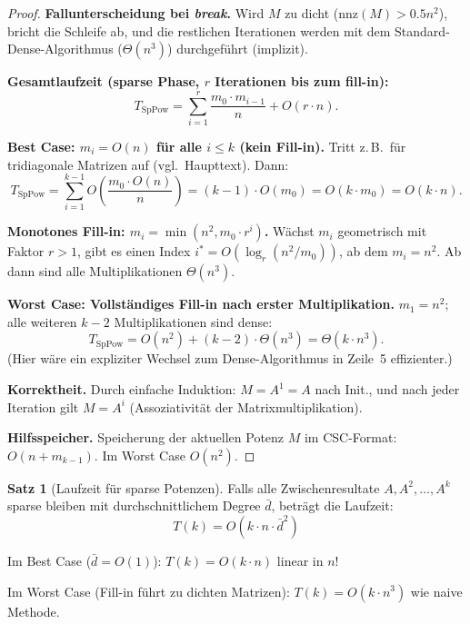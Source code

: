 \documentclass[a4paper,12pt]{report}
\theoremstyle{definition}
\newtheorem{satz}{Satz}
\begin{document}
\begin{proof}
		\textbf{Fallunterscheidung bei \textit{break}.} Wird $M$ zu dicht ($\mathrm{nnz}(M) > 0.5 n^2$), bricht die Schleife ab, und die restlichen Iterationen werden mit dem Standard-Dense-Algorithmus ($\Theta(n^3)$) durchgeführt (implizit).

		\textbf{Gesamtlaufzeit (sparse Phase, $r$ Iterationen bis zum fill-in):}
		\[
			T_{\mathrm{SpPow}} = \sum_{i=1}^{r} \frac{m_0 \cdot m_{i-1}}{n} + O(r \cdot n).
		\]

		\textbf{Best Case: $m_i = O(n)$ für alle $i \leq k$ (kein Fill-in).}
		Tritt z.\,B.\ für tridiagonale Matrizen auf (vgl.\ Haupttext). Dann:
		\[
			T_{\mathrm{SpPow}} = \sum_{i=1}^{k-1} O\!\left(\frac{m_0 \cdot O(n)}{n}\right) = (k-1) \cdot O(m_0) = O(k \cdot m_0) = O(k \cdot n).
		\]

		\textbf{Monotones Fill-in: $m_i = \min(n^2, m_0 \cdot r^i)$.} Wächst $m_i$ geometrisch mit Faktor $r > 1$, gibt es einen Index $i^* = O(\log_r(n^2/m_0))$, ab dem $m_i = n^2$. Ab dann sind alle Multiplikationen $\Theta(n^3)$.

		\textbf{Worst Case: Vollständiges Fill-in nach erster Multiplikation.}
		$m_1 = n^2$; alle weiteren $k-2$ Multiplikationen sind dense:
		\[
			T_{\mathrm{SpPow}} = O(n^2) + (k-2) \cdot \Theta(n^3) = \Theta(k \cdot n^3).
		\]
		(Hier wäre ein expliziter Wechsel zum Dense-Algorithmus in Zeile~5 effizienter.)

		\textbf{Korrektheit.} Durch einfache Induktion: $M = A^1 = A$ nach Init., und nach jeder Iteration gilt $M = A^i$ (Assoziativität der Matrixmultiplikation).

		\textbf{Hilfsspeicher.} Speicherung der aktuellen Potenz $M$ im CSC-Format: $O(n + m_{k-1})$. Im Worst Case $O(n^2)$.
	\end{proof}

	\begin{satz}[Laufzeit für sparse Potenzen]
		Falls alle Zwischenresultate $A, A^2, \ldots, A^k$ sparse bleiben mit durchschnittlichem Degree $\bar{d}$, beträgt die Laufzeit:
		\[
		T(k) = O(k \cdot n \cdot \bar{d}^2)
		\]
		
		Im Best Case ($\bar{d} = O(1)$): $T(k) = O(k \cdot n)$ linear in $n$!
		
		Im Worst Case (Fill-in führt zu dichten Matrizen): $T(k) = O(k \cdot n^3)$ wie naive Methode.
	\end{satz}
	
\end{document}
